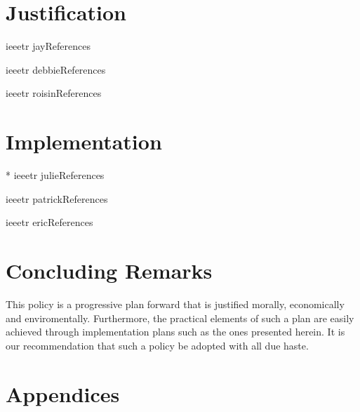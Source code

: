 \documentclass[10pt]{book} %
\begin{document}


\chapter{Justification}


{ieeetr}
{jay}{References}
\clearpage


{ieeetr}
{debbie}{References}
\clearpage


{ieeetr}
{roisin}{References}
\clearpage

\chapter{Implementation}


\nocite{julie}{*}
{ieeetr}
{julie}{References}
\clearpage


{ieeetr}
{patrick}{References}
\clearpage


{ieeetr}
{eric}{References}
\clearpage


\clearpage

\chapter{Concluding Remarks}

This policy is a progressive plan forward that is justified morally,
economically and enviromentally. Furthermore, the practical elements of such a
plan are easily achieved through implementation plans such as the ones presented
herein. It is our recommendation that such a policy be adopted with all due
haste.

\chapter*{Appendices}

%
%
\end{document}
